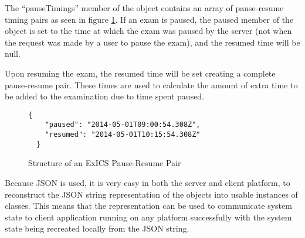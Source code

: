 The ``pauseTimings'' member of the object contains an array of pause-resume timing pairs as seen in figure \ref{fig:exics_pause}.  If an exam is paused, the paused member of the object is set to the time at which the exam was paused by the server (not when the request was made by a user to pause the exam), and the resumed time will be null.

Upon resuming the exam, the resumed time will be set creating a complete pause-resume pair.  These times are used to calculate the amount of extra time to be added to the examination due to time spent paused.

\begin{figure}[h]
  \lstset{language=JSON}
  \begin{lstlisting}[tabsize=2,breaklines=true]
  {
    "paused": "2014-05-01T09:00:54.308Z",
    "resumed": "2014-05-01T10:15:54.308Z"
  }
  \end{lstlisting}
  \caption{Structure of an ExICS Pause-Resume Pair}
  \label{fig:exics_pause}
\end{figure}

Because JSON is used, it is very easy in both the server and client platform, to reconstruct the JSON string representation of the objects into usable instances of classes.  This means that the representation can be used to communicate system state to client application running on any platform successfully with the system state being recreated locally from the JSON string.

\FloatBarrier